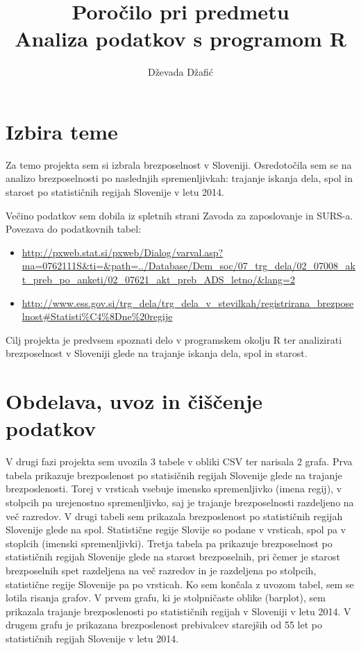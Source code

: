\documentclass[11pt,a4paper]{article}
\begin{document}
\title{Poročilo pri predmetu \\
Analiza podatkov s programom R}
\author{Dževada Džafić}
\maketitle

\section{Izbira teme}


Za temo projekta sem si izbrala brezposelnost v Sloveniji. Osredotočila sem se na analizo brezposelnosti po naslednjih spremenljivkah: trajanje iskanja dela, spol in starost po statističnih regijah Slovenije v letu 2014.

Večino podatkov sem dobila iz spletnih strani Zavoda za zaposlovanje in SURS-a.
Povezava do podatkovnih tabel:
\begin{itemize}

\item \url{http://pxweb.stat.si/pxweb/Dialog/varval.asp?ma=0762111S&ti=&path=../Database/Dem_soc/07_trg_dela/02_07008_akt_preb_po_anketi/02_07621_akt_preb_ADS_letno/&lang=2}
\item \url{http://www.ess.gov.si/trg_dela/trg_dela_v_stevilkah/registrirana_brezposelnost#Statisti%C4%8Dne%20regije}

\end{itemize}

Cilj projekta je predvsem spoznati delo v programskem okolju R ter analizirati brezposelnost v Sloveniji glede na trajanje iskanja dela, spol in starost.


\section{Obdelava, uvoz in čiščenje podatkov}

V drugi fazi projekta sem uvozila 3 tabele v obliki CSV ter narisala 2 grafa.
Prva tabela prikazuje brezposlenost po statisičnih regijah Slovenije glede na trajanje brezposlenosti. Torej v vrsticah vsebuje imensko spremenljivko (imena regij), v stolpcih pa urejenostno spremenljivko, saj je trajanje brezposelnosti razdeljeno  na več razredov. 
V drugi tabeli sem prikazala brezposlenost po statističnih regijah Slovenije glede na spol. Statistične regije Slovije so podane v vrsticah, spol pa v stoplcih (imenski spremenljivki). Tretja tabela pa prikazuje brezposelnost po statističnih regijah Slovenije glede na starost brezposelnih, pri čemer je starost brezposelnih spet razdeljena na več razredov in je razdeljena po stolpcih, statistične regije Slovenije pa po vrsticah.
\newpage
Ko sem končala z uvozom tabel, sem se lotila risanja grafov. V prvem grafu, ki je stolpničaste oblike (barplot), sem prikazala trajanje brezposlenosti po statističnih regijah v Sloveniji v letu 2014. V drugem grafu je prikazana brezposlenost prebivalcev starejših od 55 let po statističnih regijah Slovenije v letu 2014.
\end{document}
